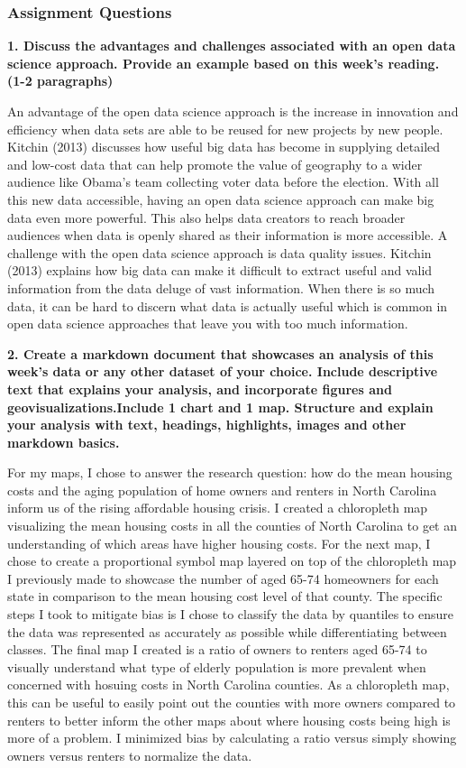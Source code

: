 \documentclass[
]{article}
\begin{document}
\subsubsection{Assignment Questions}\label{assignment-questions}

\textbf{1. Discuss the advantages and challenges associated with an open
data science approach. Provide an example based on this week's reading.
(1-2 paragraphs)}

An advantage of the open data science approach is the increase in
innovation and efficiency when data sets are able to be reused for new
projects by new people. Kitchin (2013) discusses how useful big data has
become in supplying detailed and low-cost data that can help promote the
value of geography to a wider audience like Obama's team collecting
voter data before the election. With all this new data accessible,
having an open data science approach can make big data even more
powerful. This also helps data creators to reach broader audiences when
data is openly shared as their information is more accessible. A
challenge with the open data science approach is data quality issues.
Kitchin (2013) explains how big data can make it difficult to extract
useful and valid information from the data deluge of vast information.
When there is so much data, it can be hard to discern what data is
actually useful which is common in open data science approaches that
leave you with too much information.

\textbf{2. Create a markdown document that showcases an analysis of this
week's data or any other dataset of your choice. Include descriptive
text that explains your analysis, and incorporate figures and
geovisualizations.Include 1 chart and 1 map. Structure and explain your
analysis with text, headings, highlights, images and other markdown
basics.}

For my maps, I chose to answer the research question: how do the mean
housing costs and the aging population of home owners and renters in
North Carolina inform us of the rising affordable housing crisis. I
created a chloropleth map visualizing the mean housing costs in all the
counties of North Carolina to get an understanding of which areas have
higher housing costs. For the next map, I chose to create a proportional
symbol map layered on top of the chloropleth map I previously made to
showcase the number of aged 65-74 homeowners for each state in
comparison to the mean housing cost level of that county. The specific
steps I took to mitigate bias is I chose to classify the data by
quantiles to ensure the data was represented as accurately as possible
while differentiating between classes. The final map I created is a
ratio of owners to renters aged 65-74 to visually understand what type
of elderly population is more prevalent when concerned with hosuing
costs in North Carolina counties. As a chloropleth map, this can be
useful to easily point out the counties with more owners compared to
renters to better inform the other maps about where housing costs being
high is more of a problem. I minimized bias by calculating a ratio
versus simply showing owners versus renters to normalize the data.
\end{document}
